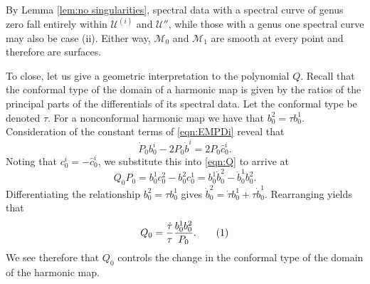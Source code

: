 \documentclass{article}
\begin{document}
By Lemma \ref{lem:no singularities}, spectral data with a spectral curve of genus zero fall entirely within $\mathcal{U}^{(i)}$ and $\mathcal{U}''$, while those with a genus one spectral curve may also be case (ii). Either way, $\mathcal{M}_0$ and $\mathcal{M}_1$ are smooth at every point and therefore are surfaces.

To close, let us give a geometric interpretation to the polynomial $Q$. Recall that the conformal type of the domain of a harmonic map is given by the ratios of the principal parts of the differentials of its spectral data. Let the conformal type be denoted $\tau$. For a nonconformal harmonic map we have that $b^2_0 = \tau b^1_0$. Consideration of the constant terms of \eqref{eqn:EMPDi} reveal that
\[
\dot{P}_0b^i_0 -2P_0 \dot{b}^i = 2P_0\hat{c}^i_0.
\]
Noting that $c^i_0 = - \hat{c}^i_0$, we substitute this into \eqref{eqn:Q} to arrive at
\[
Q_0 P_0 = b^1_0 c^2_0 - b^2_0 c^1_0 = b^1_0 \dot{b}^2_0 - \dot{b}^1_0 b^2_0.
\]
Differentiating the relationship $b^2_0 = \tau b^1_0$ gives $\dot{b}^2_0 = \dot{\tau} b^1_0 + \tau \dot{b}^1_0$. Rearranging yields that
\[
Q_0 = \frac{\dot{\tau}}{\tau} \frac{b^1_0 b^2_0}{P_0}.
\labelthis{eqn:Q0 change conformal}
\]
We see therefore that $Q_0$ controls the change in the conformal type of the domain of the harmonic map.





\end{document}
